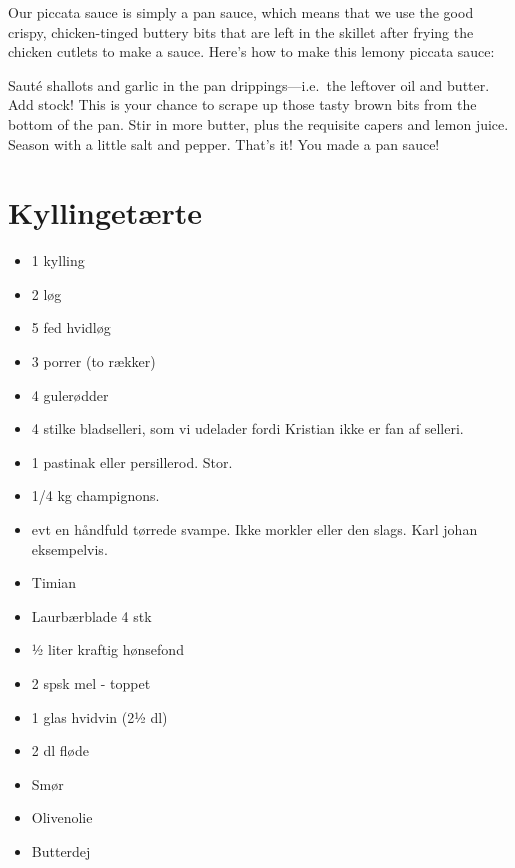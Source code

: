 \documentclass[
]{book}
\providecommand{\tightlist}{%
  \setlength{\itemsep}{0pt}\setlength{\parskip}{0pt}}
\begin{document}
Our piccata sauce is simply a pan sauce, which means that we use the good crispy, chicken-tinged buttery bits that are left in the skillet after frying the chicken cutlets to make a sauce. Here's how to make this lemony piccata sauce:

Sauté shallots and garlic in the pan drippings---i.e.~the leftover oil and butter.
Add stock! This is your chance to scrape up those tasty brown bits from the bottom of the pan.
Stir in more butter, plus the requisite capers and lemon juice.
Season with a little salt and pepper.
That's it! You made a pan sauce!

\hypertarget{kyllingetuxe6rte}{%
\section{Kyllingetærte}\label{kyllingetuxe6rte}}

\begin{itemize}
\tightlist
\item
  1 kylling
\item
  2 løg
\item
  5 fed hvidløg
\item
  3 porrer (to rækker)
\item
  4 gulerødder
\item
  4 stilke bladselleri, som vi udelader fordi Kristian ikke er fan af selleri.
\item
  1 pastinak eller persillerod. Stor.
\item
  1/4 kg champignons.
\item
  evt en håndfuld tørrede svampe. Ikke morkler eller den slags. Karl johan eksempelvis.
\item
  Timian
\item
  Laurbærblade 4 stk
\item
  ½ liter kraftig hønsefond
\item
  2 spsk mel - toppet
\item
  1 glas hvidvin (2½ dl)
\item
  2 dl fløde
\item
  Smør
\item
  Olivenolie
\item
  Butterdej
\end{itemize}
\end{document}
